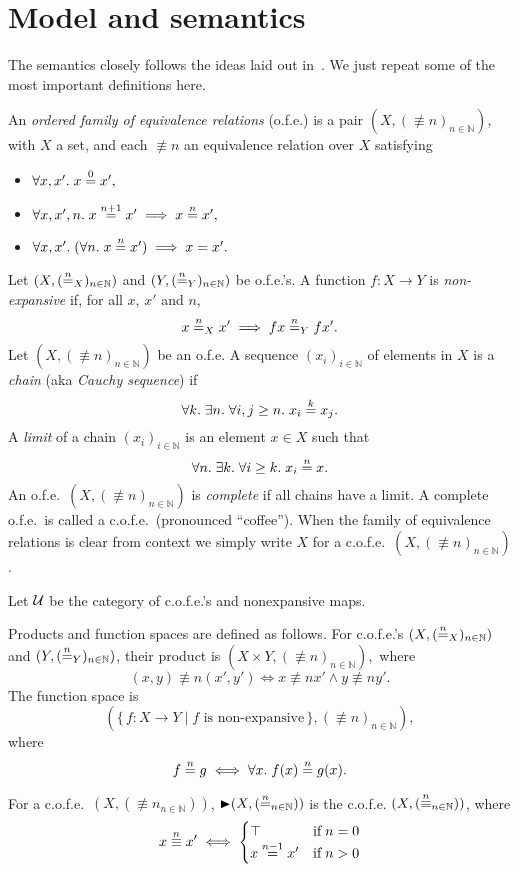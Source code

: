 \section{Model and semantics}

The semantics closely follows the ideas laid out in~\cite{catlogic}.
We just repeat some of the most important definitions here.

An \emph{ordered family of equivalence relations} (o.f.e.\@) is a pair
$(X,(\nequiv{n})_{n\in\mathbb{N}})$, with $X$ a set, and each $\nequiv{n}$ 
an equivalence relation over $X$ satisfying
\begin{itemize}
	\item $\All x,x'. x \nequiv{0} x',$
	\item $\All x,x',n. x \nequiv{n+1} x' \implies x \nequiv{n} x',$
	\item $\All x,x'. (\All n. x\nequiv{n} x') \implies x = x'.$
\end{itemize}
\a
Let $(X,(\mathrel{\stackrel{n}{=}_{X}})_{n\in\mathbb{N}})$ and
$(Y,(\mathrel{\stackrel{n}{=}_{Y}})_{n\in\mathbb{N}})$ be o.f.e.'s. A function $f:
X\to Y$ is \emph{non-expansive} if,   for all $x$, $x'$ and $n$,
\[
x \mathrel{\stackrel{n}{=}_{X}} x' \implies 
fx \mathrel{\stackrel{n}{=}_{Y}} f x'.
\]
Let $(X,(\nequiv{n})_{n\in\mathbb{N}})$ be an o.f.e.
A sequence $(x_i)_{i\in\mathbb{N}}$ of elements in $X$ is a
\emph{chain} (aka \emph{Cauchy sequence}) if
\[
\All k. \Exists n. \All i,j\geq n. x_i \nequiv{k} x_j.
\]
A \emph{limit} of a chain $(x_i)_{i\in\mathbb{N}}$ is an element
$x\in X$ such that
\[
\All n. \Exists k. \All i\geq k. x_i \nequiv{n} x.
\]
An o.f.e.\ $(X,(\nequiv{n})_{n\in\mathbb{N}})$ is \emph{complete} 
if all chains have a limit.
A complete o.f.e.\ is called a c.o.f.e.\ (pronounced ``coffee'').
When the family of equivalence relations is clear from context we
simply
write $X$ for a c.o.f.e.\ $(X,(\nequiv{n})_{n\in\mathbb{N}})$.


Let $\cal U$ be the category of c.o.f.e.'s and nonexpansive maps.

Products and function spaces are defined as follows.
For c.o.f.e.'s $(X,(\mathrel{\stackrel{n}{=}_{X}})_{n\in\mathbb{N}})$ and
$(Y,(\mathrel{\stackrel{n}{=}_{Y}})_{n\in\mathbb{N}})$, their product 
is 
$(X\times Y, (\nequiv{n})_{n\in\mathbb{N}}),$
where
\[
(x,y) \nequiv{n} (x',y') \iff
x \nequiv{n} x' \land
y \nequiv{n} y'.
\]
The function space is
\[
(\{\, f : X\to Y \mid f \text{ is non-expansive}\,\}, (\nequiv{n})_{n\in\mathbb{N}}),
\]
where
\[
f \nequiv{n} g \iff
\All x. f(x)  \nequiv{n}  g(x).
\]

For a c.o.f.e.\ $(X,(\nequiv{n}_{n\in\mathbb{N}}))$, 
$\mathord{\blacktriangleright} (X,(\mathrel{\stackrel{n}{=}}_{n\in\mathbb{N}}))$ is the c.o.f.e.\@
$(X,(\mathrel{\stackrel{n}{\equiv}}_{n\in\mathbb{N}}))$,  where
\[
x \mathrel{\stackrel{n}{\equiv}} x' \iff \begin{cases}
\top	&\mathrel{\text{if}} n=0 \\
x \mathrel{\stackrel{n-1}{=}} x' &\mathrel{\text{if}} n>0
\end{cases}
\]

